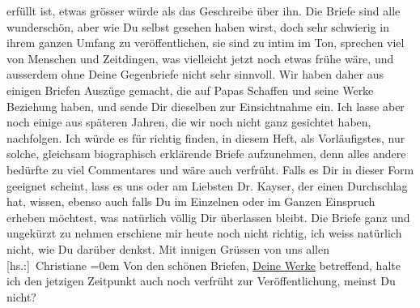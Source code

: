 \begin{ledgroupsized}[t]{13cm}
                    erfüllt ist, etwas grösser würde als das Geschreibe über ihn.\pend
           \pstart
           Die Briefe sind alle wunderschön, aber wie Du selbst gesehen haben wirst, doch
                    sehr schwierig in ihrem ganzen Umfang zu veröffentlichen, sie sind zu intim im
                    Ton, sprechen viel von Menschen und Zeitdingen, was vielleicht jetzt noch etwas
                    frühe wäre, und ausserdem ohne Deine Gegenbriefe nicht sehr sinnvoll.\pend
           \pstart
           Wir haben daher aus einigen Briefen Auszüge gemacht, die auf Papas Schaffen und seine Werke Beziehung
                    haben, und sende Dir dieselben zur Einsichtnahme ein. Ich lasse aber noch einige
                    aus späteren Jahren, die wir noch nicht ganz gesichtet haben, nachfolgen. Ich
                    würde es für richtig finden, in diesem Heft, als Vorläufigstes, nur solche,
                    gleichsam biographisch erklärende Briefe aufzunehmen, denn alles andere bedürfte
                    zu viel Commentares und wäre auch verfrüht.\pend
           \pstart
           Falls es Dir in dieser Form geeignet scheint, lass es uns oder am Liebsten Dr.
                        Kayser, der einen Durchschlag hat,
                    wissen, ebenso auch falls Du im Einzelnen oder im Ganzen Einspruch erheben
                    möchtest, was natürlich völlig Dir überlassen bleibt. Die Briefe ganz und
                    ungekürzt zu nehmen erschiene mir heute noch nicht richtig, ich weiss natürlich
                    nicht, wie Du darüber denkst.\pend
           \pstart
           Mit innigen Grüssen von uns allen{\\[\baselineskip]}\spacefill\mbox{{[}hs.:{]} Christiane}\pend
           \leftskip=0em{}\pstart
           \noindent{}{\pb}Von den schönen Briefen, \uline{Deine Werke} betreffend, halte ich den
                        jetzigen Zeitpunkt auch noch verfrüht zur Veröffentlichung, meinst Du
                        nicht?\pend
           \endnumbering{}\end{ledgroupsized}  \newcommand{\dateiname}{L02522}\newcommand{\titel}{Christiane von Hofmannsthal an Arthur Schnitzler, 3. 9. 1929}\newcommand{\editorInnen}{Martin Anton Müller und Gerd-Hermann Susen}
      